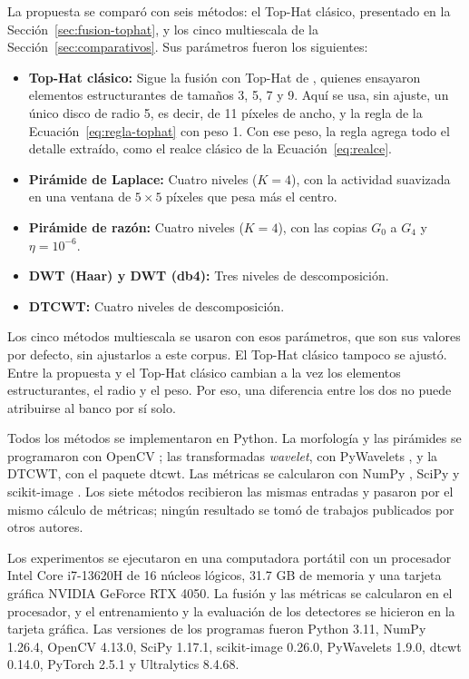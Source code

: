 La propuesta se comparó con seis métodos: el Top-Hat clásico, presentado en la
Sección~\ref{sec:fusion-tophat}, y los cinco multiescala de la Sección~\ref{sec:comparativos}. Sus
parámetros fueron los siguientes:
\begin{itemize}
\item \textbf{Top-Hat clásico:} Sigue la fusión con Top-Hat de \textcite{bajacfigueredo2024}, quienes
ensayaron elementos estructurantes de tamaños 3, 5, 7 y 9. Aquí se usa, sin ajuste, un único disco de
radio 5, es decir, de 11 píxeles de ancho, y la regla de la Ecuación~\eqref{eq:regla-tophat} con peso 1. Con ese peso, la regla agrega todo el detalle
extraído, como el realce clásico de la Ecuación~\eqref{eq:realce}.
\item \textbf{Pirámide de Laplace:} Cuatro niveles ($K = 4$), con la actividad suavizada en una ventana
de $5 \times 5$ píxeles que pesa más el centro.
\item \textbf{Pirámide de razón:} Cuatro niveles ($K = 4$), con las copias $G_0$ a $G_4$ y
$\eta = 10^{-6}$.
\item \textbf{DWT (Haar) y DWT (db4):} Tres niveles de descomposición.
\item \textbf{DTCWT:} Cuatro niveles de descomposición.
\end{itemize}
Los cinco métodos multiescala se usaron con esos parámetros, que son sus valores por defecto, sin
ajustarlos a este corpus. El Top-Hat clásico tampoco se ajustó. Entre la propuesta y el Top-Hat clásico
cambian a la vez los elementos estructurantes, el radio y el peso. Por eso, una diferencia entre los dos
no puede atribuirse al banco por sí solo.

Todos los métodos se implementaron en Python. La morfología y las pirámides se programaron con OpenCV
\parencite{bradski2000}; las transformadas \textit{wavelet}, con PyWavelets \parencite{lee2019}, y la
DTCWT, con el paquete dtcwt. Las métricas se calcularon con NumPy \parencite{harris2020}, SciPy
\parencite{virtanen2020} y scikit-image \parencite{vanderwalt2014}. Los siete métodos recibieron las
mismas entradas y pasaron por el mismo cálculo de métricas; ningún resultado se tomó de trabajos
publicados por otros autores.

Los experimentos se ejecutaron en una computadora portátil con un procesador Intel Core i7-13620H de 16 núcleos
lógicos, 31.7 GB de memoria y una tarjeta gráfica \mbox{NVIDIA} GeForce RTX 4050. La fusión y las métricas se
calcularon en el procesador, y el entrenamiento y la evaluación de los detectores se hicieron en la
tarjeta gráfica. Las versiones de los programas fueron Python 3.11, NumPy 1.26.4, OpenCV 4.13.0, SciPy 1.17.1,
scikit-image 0.26.0, PyWavelets 1.9.0, dtcwt 0.14.0, PyTorch 2.5.1 y Ultralytics 8.4.68.

